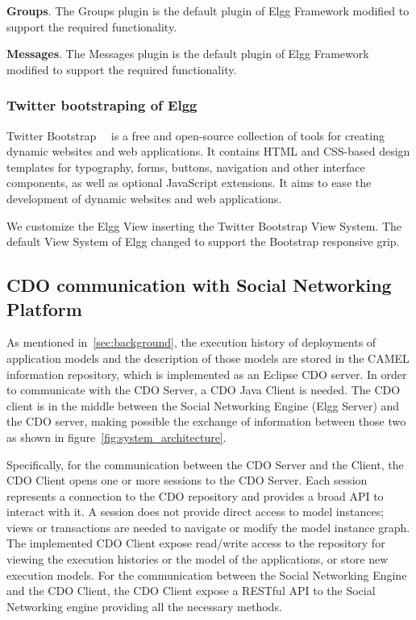 \textbf{Groups}. The Groups plugin is the default plugin of Elgg Framework modified to support the required functionality.

\textbf{Messages}. The Messages plugin is the default plugin of Elgg Framework modified to support the required functionality.

\subsubsection{Twitter bootstraping of Elgg}
Twitter Bootstrap~\cite{twitter_bootstrap}~\cite{cochran2012twitter} is a free and open-source collection of tools for creating dynamic websites and web applications. It contains HTML and CSS-based design templates for typography, forms, buttons, navigation and other interface components, as well as optional JavaScript extensions. It aims to ease the development of dynamic websites and web applications. 

We customize the Elgg View inserting the Twitter Bootstrap View System. The default View System of Elgg changed to support the Bootstrap responsive grip.

\subsection{CDO communication with Social Networking Platform}
\label{sec:cdo_comm}
As mentioned in~\ref{sec:background}, the execution history of deployments of application models and the description of those models are stored in the CAMEL information repository, which is implemented as an Eclipse CDO server. In order to communicate with the CDO Server, a CDO Java Client is needed. The CDO client is in the middle between the Social Networking Engine (Elgg Server) and the CDO server, making possible the exchange of information between those two as shown in figure~\ref{fig:system_architecture}.

Specifically, for the communication between the CDO Server and the Client, the CDO Client opens one or more sessions to the CDO Server. Each session represents a connection to the CDO repository and provides a broad API to interact with it. A session does not provide direct access to model instances; views or transactions are needed to navigate or modify the model instance graph. The implemented CDO Client expose read/write access to the repository for viewing the execution histories or the model of the applications, or store new execution models. For the communication between the Social Networking Engine and the CDO Client, the CDO Client expose a RESTful API to the Social Networking engine providing all the necessary methods. 

